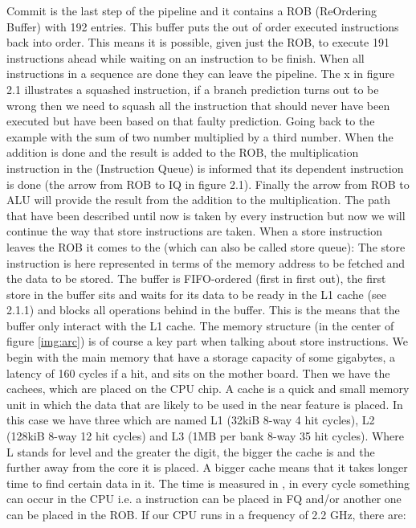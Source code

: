 Commit is the last step of the pipeline and it contains a ROB (ReOrdering Buffer)
with 192 entries. This buffer puts the out of order executed instructions back into
order. This means it is possible, given just the ROB, to execute 191 instructions ahead
while waiting on an instruction to be finish. When all instructions in a sequence are
done they can leave the pipeline. The {\color{red}x} in figure 2.1 \fixme illustrates a squashed instruction,
if a branch prediction turns out to be wrong then we need to squash all the instruction
that should never have been executed but have been based on that faulty prediction.
Going back to the example with the sum of two number multiplied by a third number.
When the addition is done and the result is added to the ROB, the multiplication
instruction in the  (Instruction Queue) is informed that its dependent instruction
is done (the arrow from ROB to IQ in figure 2.1\fixme). Finally the arrow from ROB to
ALU will provide the result from the addition to the multiplication.
The path that have been described until now is taken by every instruction but now
we will continue the way that store instructions are taken. When a store instruction
leaves the ROB it comes to the  (which can also be called store queue):
The store instruction is here represented in terms of the memory address to be fetched
and the data to be stored. The buffer is FIFO-ordered (first in first out), the first
store in the buffer sits and waits for its data to be ready in the L1 cache (see 2.1.1)
and blocks all operations behind in the buffer. This is the means that the buffer only
interact with the L1 cache.
The memory structure (in the center of figure \ref{img:arc}) is of course a key part when talking
about store instructions. We begin with the main memory that have a storage capacity
of some gigabytes, a latency of 160 cycles if a hit, and sits on the mother board. Then
we have the cachees, which are placed on the CPU chip. A cache is a quick and small
memory unit in which the data that are likely to be used in the near feature is placed.
In this case we have three which are named L1 (32kiB 8-way 4 hit cycles), L2 (128kiB
8-way 12 hit cycles) and L3 (1MB per bank 8-way 35 hit cycles). Where L stands for
level and the greater the digit, the bigger the cache is and the further away from the
core it is placed. A bigger cache means that it takes longer time to find certain data
in it. The time is measured in , in every cycle something can occur in the CPU
i.e. a instruction can be placed in FQ and/or another one can be placed in the ROB.
If our CPU runs in a frequency of 2.2 GHz, there are:

